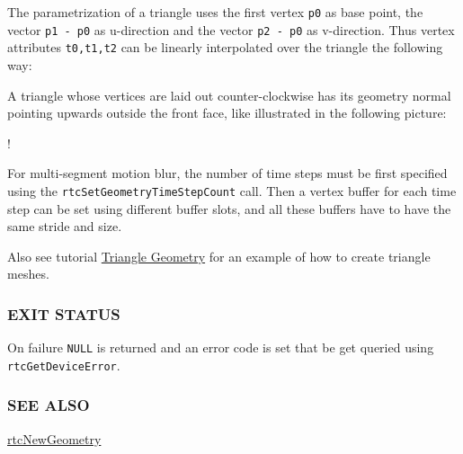 The parametrization of a triangle uses the first vertex \texttt{p0} as
base point, the vector \texttt{p1\ -\ p0} as u-direction and the vector
\texttt{p2\ -\ p0} as v-direction. Thus vertex attributes
\texttt{t0,t1,t2} can be linearly interpolated over the triangle the
following way:

\begin{Shaded}
\begin{Highlighting}[]
\OperatorTok{=} \OperatorTok{(}\OperatorTok{{-}}\OperatorTok{{-}}\OperatorTok{)*}\OperatorTok{+}\OperatorTok{*}\OperatorTok{+}\OperatorTok{*}
     \OperatorTok{=}\OperatorTok{+}\OperatorTok{*(}\OperatorTok{{-}}\OperatorTok{)} \OperatorTok{+}\OperatorTok{*(}\OperatorTok{{-}}\OperatorTok{)}
\end{Highlighting}
\end{Shaded}

A triangle whose vertices are laid out counter-clockwise has its
geometry normal pointing upwards outside the front face, like
illustrated in the following picture:

!\href{images/triangle_uv.pdf}{}

For multi-segment motion blur, the number of time steps must be first
specified using the \texttt{rtcSetGeometryTimeStepCount} call. Then a
vertex buffer for each time step can be set using different buffer
slots, and all these buffers have to have the same stride and size.

Also see tutorial \hyperref[triangle-geometry]{Triangle Geometry} for an
example of how to create triangle meshes.

\subsubsection{EXIT STATUS}\label{exit-status}

On failure \texttt{NULL} is returned and an error code is set that be
get queried using \texttt{rtcGetDeviceError}.

\subsubsection{SEE ALSO}\label{see-also}

\hyperref[rtcnewgeometry]{rtcNewGeometry}

\pagebreak

